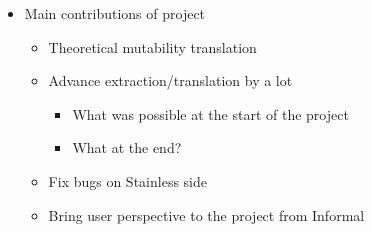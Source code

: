 \begin{itemize}
\tightlist
\item
  Main contributions of project

  \begin{itemize}
  \tightlist
  \item
    Theoretical mutability translation
  \item
    Advance extraction/translation by a lot

    \begin{itemize}
    \tightlist
    \item
      What was possible at the start of the project
    \item
      What at the end?
    \end{itemize}
  \item
    Fix bugs on Stainless side
  \item
    Bring user perspective to the project from Informal
  \end{itemize}
\end{itemize}
